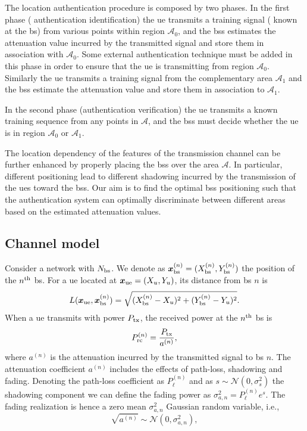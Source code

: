 \documentclass[twocolumns]{IEEEtran}
\begin{document}
The location authentication procedure is composed by two phases. In the first phase ( authentication identification) the \ac{ue} transmits a training signal ( known at the \acs{bs}) from various points within region $\mathcal{A}_0$, and the \acp{bs} estimates the attenuation value incurred by the transmitted signal and store them in association with $\mathcal{A}_0$. Some external authentication technique must be added in this phase in order to ensure that the \ac{ue} is transmitting from region $\mathcal{A}_0$. Similarly the \ac{ue} transmits a training signal from the complementary area $\mathcal{A}_1$ and the \acp{bs} estimate the attenuation value and store them in association to $\mathcal{A}_1$.

In the second phase (authentication verification) the \ac{ue} transmits a known training sequence from any points in $\mathcal{A}$, and the \acp{bs} must decide whether the \ac{ue} is in region $\mathcal{A}_0$ or $\mathcal{A}_1$.

The location dependency of the features of the transmission channel can be further enhanced by properly placing the \acp{bs} over the area $\mathcal{A}$. In particular, different positioning lead to different shadowing incurred by the transmission of the \acp{ue} toward the \acp{bs}. Our aim is to find the optimal \acp{bs} positioning such that the authentication system can optimally discriminate between different areas based on the estimated attenuation values.

\subsection{Channel model}

Consider a network with $N_{\rm bs}$. We denote as $\bm{x}_{\rm bs}^{(n)} =(X_{\rm bs}^{(n)},Y_{\rm bs}^{(n)})$ the position of the $n^{\rm th}$ \ac{bs}. For a \ac{ue} located at $\bm{x}_{\rm ue}=(X_u,Y_u)$, its distance from \ac{bs} $n$ is
\begin{equation}
    L(\bm{x}_{\rm ue},\bm{x}_{\rm bs}^{(n)}) = \sqrt{(X_{\rm bs}^{(n)}-X_u)^2+(Y_{\rm bs}^{(n)}-Y_u)^2}.
\end{equation}
When a \ac{ue} transmits with power $P_{\rm tx}$, the received power at the $n^{\rm th}$ \ac{bs} is
\begin{equation}\label{eq: rec pow}
    P_{\rm rc}^{(n)}= \frac{P_{\rm tx}}{a^{(n)}},
\end{equation}
where $a^{(n)}$ is the attenuation incurred by the transmitted signal to \ac{bs} $n$. The attenuation coefficient $a^{(n)}$ includes the effects of path-loss, shadowing and fading. Denoting the path-loss coefficient as $P_{\ell}^{(n)}$ and as $s \sim \mathcal{N}(0,\sigma_s^2)$ the shadowing component we can define the fading power as $\sigma_{a,n}^2={P_{\ell}^{(n)}}e^{s}$. The fading realization is hence a zero mean $\sigma_{a,n}^2$ Gaussian random variable, i.e.,
\begin{equation}
    \sqrt{a^{(n)}} \sim \mathcal{N}\left(0,\sigma_{a,n}^2\right),
\end{equation}
\end{document}
